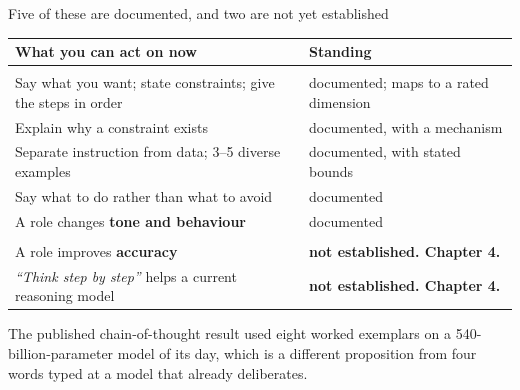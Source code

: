 \documentclass[aspectratio=169,11pt]{beamer}
\begin{document}
\begin{frame}{Five of these are documented, and two are not yet established}
  \vspace{0.2em}
  {\footnotesize
  \begin{tabular}{@{}p{}p{}@{}}
    \textbf{What you can act on now} & \textbf{Standing} \\[0.2em]
    \hline\\[-0.7em]
    Say what you want; state constraints; give the steps in order &
      documented; maps to a rated dimension \\[0.25em]
    Explain why a constraint exists & documented, with a mechanism \\[0.25em]
    Separate instruction from data; 3--5 diverse examples &
      documented, with stated bounds \\[0.25em]
    Say what to do rather than what to avoid & documented \\[0.25em]
    A role changes \textbf{tone and behaviour} & documented \\[0.4em]
    \hline\\[-0.7em]
    A role improves \textbf{accuracy} & \textcolor{uhred}{\textbf{not established. Chapter 4.}} \\[0.25em]
    \emph{``Think step by step''} helps a current reasoning model &
      \textcolor{uhred}{\textbf{not established. Chapter 4.}} \\
  \end{tabular}}
  \vspace{0.2em}
  {\scriptsize The published chain-of-thought result used eight worked exemplars on a
   540-billion-parameter model of its day, which is a different proposition from four words
   typed at a model that already deliberates.}
\end{frame}
\end{document}
